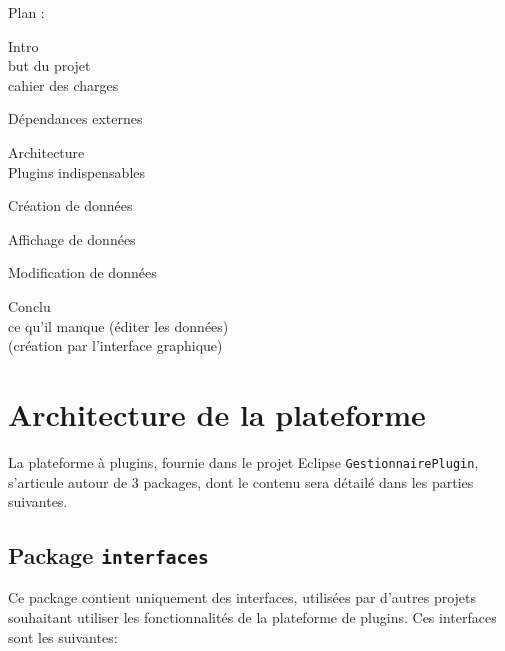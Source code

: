 \documentclass[a4paper]{report}
\begin{document}



\tableofcontents

Plan : 

	Intro\\
		but du projet\\
		cahier des charges

	Dépendances externes

	Architecture  \\
		Plugins indispensables

		Création de données

		Affichage de données

		Modification de données

	Conclu\\
		ce qu'il manque (éditer les données)\\
		(création par l'interface graphique)
	
	
	
	
	
\chapter{Architecture de la plateforme}

La plateforme à plugins, fournie dans le projet Eclipse \texttt{GestionnairePlugin}, s'articule autour de 3 packages, dont le contenu sera détailé dans les parties suivantes.

\section{Package \texttt{interfaces}}

Ce package contient uniquement des interfaces, utilisées par d'autres projets souhaitant utiliser les fonctionnalités de la plateforme de plugins. Ces interfaces sont les suivantes:\\
\end{document}
